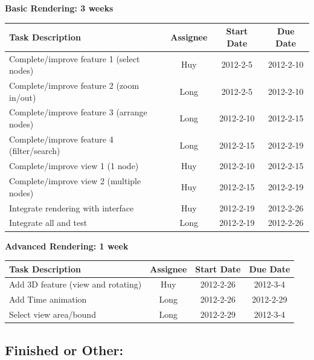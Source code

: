 \documentclass[12pt, letterpaper]{article}
\begin{document}
  \begin{center}
		{\bf Basic Rendering: 3 weeks}
    \begin{tabular}{| p{8.3cm} || c | c | c | }
      \hline
      Task Description & Assignee & Start Date & Due Date \\
      \hline
 	    Complete/improve feature 1 (select nodes) & Huy & 2012-2-5 & 2012-2-10 \\
	    Complete/improve feature 2 (zoom in/out)  & Long & 2012-2-5 & 2012-2-10 \\
	    Complete/improve feature 3 (arrange nodes)  & Long & 2012-2-10 & 2012-2-15 \\
	    Complete/improve feature 4 (filter/search)  & Long & 2012-2-15 & 2012-2-19 \\
	    Complete/improve view 1 (1 node)  & Huy& 2012-2-10 & 2012-2-15 \\
            Complete/improve view 2 (multiple nodes)  & Huy & 2012-2-15 & 2012-2-19 \\
            Integrate rendering with interface  & Huy & 2012-2-19 & 2012-2-26 \\  
            Integrate all and test  & Long & 2012-2-19 & 2012-2-26 \\
      \hline
    \end{tabular}
  \end{center}

  \begin{center}
		{\bf Advanced Rendering: 1 week}
    \begin{tabular}{|p{8.3cm} || c | c | c | }
      \hline
      Task Description & Assignee & Start Date & Due Date \\
      \hline
	    Add 3D feature (view and rotating) & Huy & 2012-2-26 & 2012-3-4 \\
	    Add Time animation & Long & 2012-2-26 & 2012-2-29 \\
		Select view area/bound & Long & 2012-2-29 & 2012-3-4 \\
      \hline
    \end{tabular}
  \end{center}

	\subsection{Finished or Other:}
\end{document}
